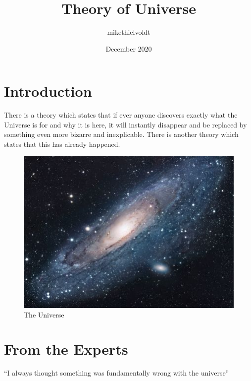 \documentclass{article}
\title{Theory of Universe}
\author{mikethielvoldt }
\date{December 2020}
\begin{document}
\maketitle

\section{Introduction}
There is a theory which states that if ever anyone discovers exactly what the Universe is for and why it is here, it will instantly disappear and be replaced by something even more bizarre and inexplicable.
There is another theory which states that this has already happened.

\begin{figure}[h!]
\centering
\includegraphics[scale=1.7]{universe}
\caption{The Universe}
\label{fig:universe}
\end{figure}

\section{From the Experts}
``I always thought something was fundamentally wrong with the universe'' \citep{adams1995hitchhiker}



\end{document}
